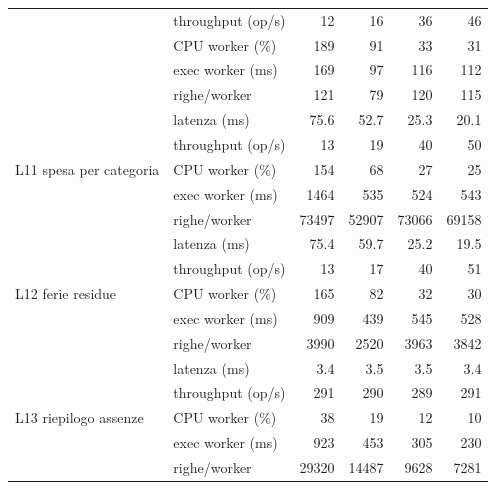 \begin{longtable}{@{}llrrrr@{}}
 & throughput (op/s) & 12 & 16 & 36 & 46 \\
 & CPU worker (\%)   & 189 & 91 & 33 & 31 \\
 & exec worker (ms)  & 169 & 97 & 116 & 112 \\
 & righe/worker      & 121 & 79 & 120 & 115 \\ \midrule
\multirow{5}{*}{L11 spesa per categoria} & latenza (ms)     & 75.6 & 52.7 & 25.3 & 20.1 \\
 & throughput (op/s) & 13 & 19 & 40 & 50 \\
 & CPU worker (\%)   & 154 & 68 & 27 & 25 \\
 & exec worker (ms)  & 1464 & 535 & 524 & 543 \\
 & righe/worker      & 73497 & 52907 & 73066 & 69158 \\ \midrule
\multirow{5}{*}{L12 ferie residue} & latenza (ms)     & 75.4 & 59.7 & 25.2 & 19.5 \\
 & throughput (op/s) & 13 & 17 & 40 & 51 \\
 & CPU worker (\%)   & 165 & 82 & 32 & 30 \\
 & exec worker (ms)  & 909 & 439 & 545 & 528 \\
 & righe/worker      & 3990 & 2520 & 3963 & 3842 \\ \midrule
\multirow{5}{*}{L13 riepilogo assenze} & latenza (ms)     & 3.4 & 3.5 & 3.5 & 3.4 \\
 & throughput (op/s) & 291 & 290 & 289 & 291 \\
 & CPU worker (\%)   & 38 & 19 & 12 & 10 \\
 & exec worker (ms)  & 923 & 453 & 305 & 230 \\
 & righe/worker      & 29320 & 14487 & 9628 & 7281 \\ \midrule
\bottomrule
\end{longtable}
\endgroup
